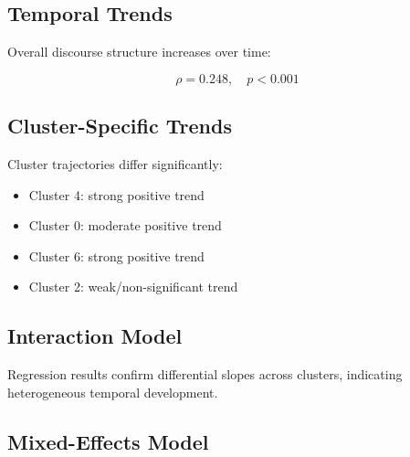 \documentclass[11pt]{article}
\begin{document}
\subsection{Temporal Trends}



Overall discourse structure increases over time:



\[

\rho = 0.248,\quad p < 0.001

\]



\subsection{Cluster-Specific Trends}



Cluster trajectories differ significantly:



\begin{itemize}

\item Cluster 4: strong positive trend

\item Cluster 0: moderate positive trend

\item Cluster 6: strong positive trend

\item Cluster 2: weak/non-significant trend

\end{itemize}



\subsection{Interaction Model}



Regression results confirm differential slopes across clusters, indicating heterogeneous temporal development.



\subsection{Mixed-Effects Model}
\end{document}
